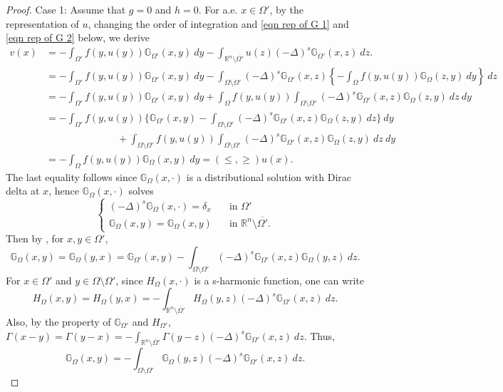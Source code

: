 \documentclass{amsart}
\newcommand{\R}{\mathbb{R}}
\newcommand{\slap}{(-\Delta)^{s}}
\newcommand{\gk}[1]{\mathbb{G}_{#1}}
\begin{document}
\begin{proof}
     Case 1: Assume that $g=0$ and $h=0$. 
     For a.e. $x\in \Omega'$, by the representation of $u$, changing the order of integration and \eqref{eqn rep of G 1} and \eqref{eqn rep of G 2} below, we derive
     \begin{equation*}
     \begin{split}
    v(x)&=-\int_{\Omega'}f(y,u(y))\gk{\Omega'}(x,y)\ dy-\int_{\R^{n}\setminus\overline{\Omega'}}u(z)\slap \gk{\Omega'}(x,z)\ dz.\\
        &=-\int_{\Omega'}f(y,u(y))\gk{\Omega'}(x,y)\ dy-\int_{\Omega\setminus\Omega'}\slap \gk{\Omega'}(x,z) \left\{-\int_{\Omega}f(y,u(y))\gk{\Omega}(z,y)\ dy\right\}\ dz\\
        &=-\int_{\Omega'}f(y,u(y))\gk{\Omega'}(x,y)\ dy+\int_{\Omega}f(y,u(y))\int_{\Omega\setminus\Omega'}\slap \gk{\Omega'}(x,z)\gk{\Omega}(z,y)\ dz\ dy\\
        &=-\int_{\Omega'}f(y,u(y))\Big\{\gk{\Omega'}(x,y)-\int_{\Omega\setminus\Omega'}\slap \gk{\Omega'}(x,z)\gk{\Omega}(z,y)\ dz\Big\}\ dy\\
        &\hspace{3cm} + \int_{\Omega\setminus\Omega'}f(y,u(y))\int_{\Omega\setminus\Omega'}\slap \gk{\Omega'}(x,z)\gk{\Omega}(z,y)\ dz\ dy\\
        &=-\int_{\Omega}f(y,u(y))\gk{\Omega}(x,y)\ dy=(\leq,\geq)u(x). 
     \end{split}
     \end{equation*}
     The last equality follows since $\gk{\Omega}(x,\cdot)$ is a distributional solution with Dirac delta at $x$, hence $\gk{\Omega}(x,\cdot)$ solves 
     \begin{equation*}
        \begin{cases}
            \slap \gk{\Omega}(x,\cdot)=\delta_{x}\quad &\text{in }\Omega'\\
            \gk{\Omega}(x,y)=\gk{\Omega}(x,y) &\text{in }\R^{n}\setminus\overline{\Omega'}.
        \end{cases}
     \end{equation*}
     Then by \cite[Theorem 1.4]{Abatangelo2015LargesHarmonic}, for $x,y\in \Omega'$, 
     \begin{equation}\label{eqn rep of G 1}
         \gk{\Omega}(x,y)=\gk{\Omega}(y,x)=\gk{\Omega'}(x,y)-\int_{\Omega\setminus\Omega'}\slap \gk{\Omega'}(x,z)\gk{\Omega}(y,z)\ dz.
     \end{equation}
     For $x\in \Omega'$ and $y\in \Omega\setminus\Omega'$, since $H_{\Omega}(x,\cdot)$ is a s-harmonic function, one can write
     \begin{equation*}
        H_{\Omega}(x,y)=H_{\Omega}(y,x)=-\int_{\R^{n}\setminus\overline{\Omega'}}H_{\Omega}(y,z) \slap \gk{\Omega'}(x,z)\ dz.
     \end{equation*}
     Also, by the property of $\gk{\Omega'}$ and $H_{\Omega'}$, $\displaystyle \Gamma(x-y)=\Gamma(y-x)=-\int_{\R^{n}\setminus\overline{\Omega'}}\Gamma(y-z)\slap \gk{\Omega'}(x,z)\ dz.$
     Thus,
     \begin{equation}\label{eqn rep of G 2}
         \gk{\Omega}(x,y)=-\int_{\Omega\setminus\Omega'}\gk{\Omega}(y,z)\slap\gk{\Omega'}(x,z)\ dz.
     \end{equation}
    

\end{proof}
\end{document}
